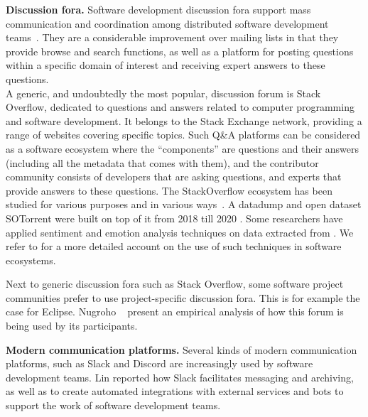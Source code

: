 \smallskip
\textbf{Discussion fora.} Software development discussion fora support mass communication and coordination among distributed software development teams~\cite{Storey2017-TSE}. They are a considerable improvement over mailing lists in that they provide browse and search functions, as well as a platform for posting questions within a specific domain of interest and receiving expert answers to these questions.\\
A generic, and undoubtedly the most popular, discussion forum is Stack Overflow, dedicated to questions and answers related to computer programming and software development. It belongs to the Stack Exchange network, providing a range of websites covering specific topics. Such Q\&A platforms can be considered as a software ecosystem where the ``components'' are questions and their answers (including all the metadata that comes with them), and the contributor community consists of developers that are asking questions, and experts that provide answers to these questions.
The StackOverflow ecosystem has been studied for various purposes and in various ways~\cite{SO1,SO3,SO2,Nagy2015,Zagalsky2018-EMSE,Bangash2019,Manes2019,AhasanuzzamanAR20}. A datadump and open dataset SOTorrent were built on top of it from 2018 till 2020 \cite{Baltes2018,Baltes2019,baltes2021zenodo}.
Some researchers \cite{NovielliCL15,FontaoESD17,2-083} have applied sentiment and emotion analysis techniques on data extracted from \stackoverflow. We refer to  for a more detailed account on the use of such techniques in software ecosystems.

Next to generic discussion fora such as Stack Overflow, some software project communities prefer to use project-specific discussion fora. This is for example the case for Eclipse. Nugroho \etal~\cite{Nugroho2021} present an empirical analysis of how this forum is being used by its participants.

\smallskip
\textbf{Modern communication platforms.} Several kinds of modern communication platforms, such as Slack and Discord are increasingly used by software development teams. Lin \etal \cite{Lin2016} reported how Slack facilitates messaging and archiving, as well as to create automated integrations with external services and bots to support the work of software development teams.


